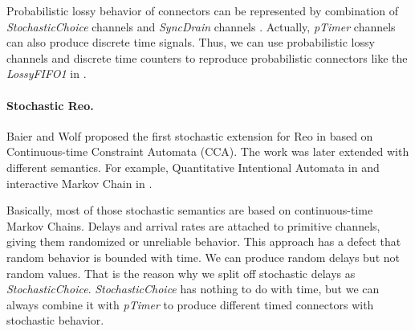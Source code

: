 Probabilistic lossy behavior of connectors can be represented by combination of \emph{StochasticChoice} channels and \emph{SyncDrain} channels . Actually, \emph{pTimer} channels can also produce discrete time signals. Thus, we can use probabilistic lossy channels and discrete time counters to reproduce probabilistic connectors like the \emph{LossyFIFO1} in \cite{Models2005}.

\paragraph{Stochastic Reo.}
Baier and Wolf proposed the first stochastic extension for Reo in \cite{Baier2006} based on Continuous-time Constraint Automata (CCA). The work was later extended with different semantics. For example, Quantitative Intentional Automata in \cite{Arbab2009} and interactive Markov Chain in \cite{Oliveira2016}.

Basically, most of those stochastic semantics are based on continuous-time Markov Chains. Delays and arrival rates are attached to primitive channels, giving them randomized or unreliable behavior. This approach has a defect that random behavior is bounded with time. We can produce random delays but not random values. That is the reason why we split off stochastic delays as \emph{StochasticChoice}. \emph{StochasticChoice} has nothing to do with time, but we can always combine it with \emph{pTimer} to produce different timed connectors with stochastic behavior.





        
